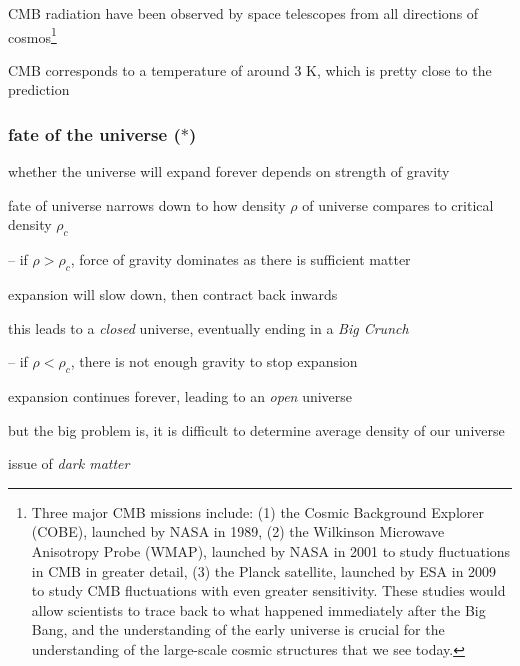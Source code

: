 CMB radiation have been observed by space telescopes from all directions of cosmos\footnote{Three major CMB missions include: (1) the Cosmic Background Explorer (COBE), launched by NASA in 1989, (2) the Wilkinson Microwave Anisotropy Probe (WMAP), launched by NASA in 2001 to study fluctuations in CMB in greater detail, (3) the Planck satellite, launched by ESA in 2009 to study CMB fluctuations with even greater sensitivity. These studies would allow scientists to trace back to what happened immediately after the Big Bang, and the understanding of the early universe is crucial for the understanding of the large-scale cosmic structures that we see today.}

CMB corresponds to a temperature of around 3 K, which is pretty close to the prediction



\subsubsection{fate of the universe ($\ast$)}

whether the universe will expand forever depends on strength of gravity

fate of universe narrows down to how density $\rho$ of universe compares to critical density $\rho_c$

\begin{compactitem}

\item[--] if $\rho > \rho_c$, force of gravity dominates as there is sufficient matter

expansion will slow down, then contract back inwards

this leads to a \emph{closed} universe, eventually ending in a \emph{Big Crunch} 

\item[--] if $\rho < \rho_c$, there is not enough gravity to stop expansion

expansion continues forever, leading to an \emph{open} universe

\end{compactitem}

but the big problem is, it is difficult to determine average density of our universe

\cmt issue of \emph{dark matter}

